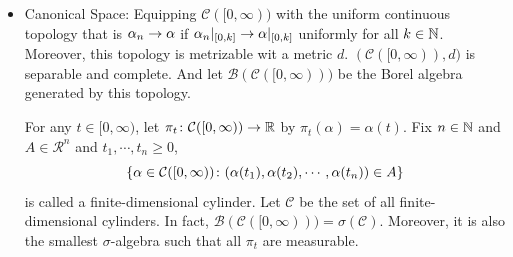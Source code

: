 \documentclass[a4paper,12pt]{article}
\begin{document}
\begin{itemize}
\begin{enumerate}[label=(\arabic*)]
    \noindent Therefore, there is a probability space $(\Omega,\mathcal{F},\Pb)$ supporting a process $(X_t)_{t \geqslant 0}$ which satisfies $(1)(2)$ for the definition of Brownian motion by letting $\mu_{(t_1,\cdots,t_n)}$ be a centered Gaussian measure on $\R^n$ with covariance $\Sigma_{ij} = \min \bb{t_i,t_j}$.

    \item For $(3)$, a real function $f \colon [0,\infty) \sto \R$ is said local H\"older continuous with $\gamma \in (0,1]$ if $\exists~\delta,K>0$ such that
    \begin{equation*}
      \abs{f(t)-f(s)} \leqslant K\abs{t-s}^{\gamma},~\forall~t,s\text{ with }\abs{t-s}<\delta
    \end{equation*}
    
    \noindent Kolmogorov-C\v{e}ntsov Theorem: If a stochastic process $(X_t)_{t \in [0,1]}$ satisfies
    \begin{equation*}
      \E[\abs{X_t -X_s}^{\alpha}] \leqslant C\abs{t-s}^{1+\beta}
    \end{equation*}
    for some $\alpha,\beta,C> 0$. Then there is modification $(\tilde{X}_t)_{t \in [0,1]}$ on $\Omega^*$ such that for $\omega \in \Omega^*$, $t \mapsto \tilde{X}_t(\omega)$ is $\gamma$-local H\"older continuous for $0 < \gamma < \frac{\beta}{\alpha}$.

    \noindent Because $X_t - X_s \sim \mathcal{N}(0, t-s)$ and $X_1 \sim \mathcal{N}(0,1)$,
    \begin{equation*}
      \E[\abs{X_t-X_s}^{2n}] = C_n\abs{t-s}^n
    \end{equation*}
    where $C_n = \E[\abs{X_1}^{2n}] = \frac{(2n)!}{2^nn!} < \infty$, there is a modification satisfying the continuous path condition. So $(B_t)_{t\in [0,1]}$ is a Brownian motion. This Brownian motion can be extended to $[0,\infty)$.
  \end{enumerate}

  \item Canonical Space: Equipping $\mathcal{C}([0,\infty))$ with the uniform continuous topology that is $\alpha_n \rightarrow \alpha$ if $\alpha_n|_{[0,k]} \rightarrow \alpha|_{[0,k]}$ uniformly for all $k \in \mathbb{N}$. Moreover, this topology is metrizable wit a metric $d$. $(\mathcal{C}([0,\infty)),d)$ is separable and complete. And let $\mathcal{B}(\mathcal{C}([0,\infty)))$ be the Borel algebra generated by this topology. 

  \noindent For any $t \in [0,\infty)$, let $\pi_t \colon \mathcal{C}([0,\infty)) \rightarrow \mathbb{R}$ by $\pi_t(\alpha)=\alpha(t)$. Fix $n\in \mathbb{N}$ and $A \in \mathcal{R}^n$ and $t_1,\cdots,t_n \geqslant 0$,
  \begin{equation*}
    \left\{\alpha \in \mathcal{C}([0,\infty)) \colon (\alpha(t_1),\alpha(t_2),\cdots,\alpha(t_n)) \in A\right\}
  \end{equation*}
  is called a finite-dimensional cylinder. Let $\mathcal{C}$ be the set of all finite-dimensional cylinders. In fact, $\mathcal{B}(\mathcal{C}([0,\infty))) = \sigma(\mathcal{C})$. Moreover, it is also the smallest $\sigma$-algebra such that all $\pi_t$ are measurable.


\end{itemize}
\end{document}

